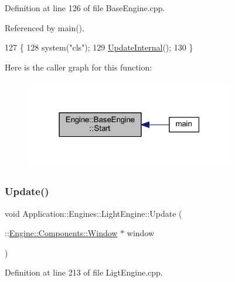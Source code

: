 Definition at line 126 of file Base\+Engine.\+cpp.



Referenced by main().


\begin{DoxyCode}
127 \{
128     system(\textcolor{stringliteral}{"cls"});
129     \mbox{\hyperlink{classEngine_1_1BaseEngine_aad3c237ca657b9f22f76fccf7fc7561f}{UpdateInternal}}();
130 \}
\end{DoxyCode}
Here is the caller graph for this function\+:
\nopagebreak
\begin{figure}[H]
\begin{center}
\leavevmode
\includegraphics[width=259pt]{classEngine_1_1BaseEngine_a525fdc7a1da7eecb514ad5763f06be79_icgraph}
\end{center}
\end{figure}
\mbox{\label{classApplication_1_1Engines_1_1LightEngine_a18575df6f8742099ae543e3b23508ee9}} 
\subsubsection{\texorpdfstring{Update()}{Update()}\hspace{0.1cm}{\footnotesize\ttfamily [1/2]}}
{\footnotesize\ttfamily void Application\+::\+Engines\+::\+Light\+Engine\+::\+Update (\begin{DoxyParamCaption}\item[{\+::\mbox{\hyperlink{classEngine_1_1Components_1_1Window}{Engine\+::\+Components\+::\+Window}} $\ast$}]{window }\end{DoxyParamCaption})\hspace{0.3cm}{\ttfamily [override]}}



Definition at line 213 of file Ligt\+Engine.\+cpp.


